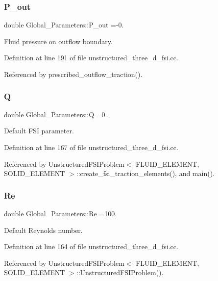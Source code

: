\subsubsection{\texorpdfstring{P\+\_\+out}{P\_out}}
{\footnotesize\ttfamily double Global\+\_\+\+Parameters\+::\+P\+\_\+out =-\/0.}



Fluid pressure on outflow boundary. 



Definition at line 191 of file unstructured\+\_\+three\+\_\+d\+\_\+fsi.\+cc.



Referenced by prescribed\+\_\+outflow\+\_\+traction().

\mbox{\label{namespaceGlobal__Parameters_a7814fddf663e56168174a42d2cd6b4c1}} 
\subsubsection{\texorpdfstring{Q}{Q}}
{\footnotesize\ttfamily double Global\+\_\+\+Parameters\+::Q =0.}



Default F\+SI parameter. 



Definition at line 167 of file unstructured\+\_\+three\+\_\+d\+\_\+fsi.\+cc.



Referenced by Unstructured\+F\+S\+I\+Problem$<$ F\+L\+U\+I\+D\+\_\+\+E\+L\+E\+M\+E\+N\+T, S\+O\+L\+I\+D\+\_\+\+E\+L\+E\+M\+E\+N\+T $>$\+::create\+\_\+fsi\+\_\+traction\+\_\+elements(), and main().

\mbox{\label{namespaceGlobal__Parameters_a9d72e94a9305c6a310940a6a427ebe06}} 
\subsubsection{\texorpdfstring{Re}{Re}}
{\footnotesize\ttfamily double Global\+\_\+\+Parameters\+::\+Re =100.}



Default Reynolds number. 



Definition at line 164 of file unstructured\+\_\+three\+\_\+d\+\_\+fsi.\+cc.



Referenced by Unstructured\+F\+S\+I\+Problem$<$ F\+L\+U\+I\+D\+\_\+\+E\+L\+E\+M\+E\+N\+T, S\+O\+L\+I\+D\+\_\+\+E\+L\+E\+M\+E\+N\+T $>$\+::\+Unstructured\+F\+S\+I\+Problem().

